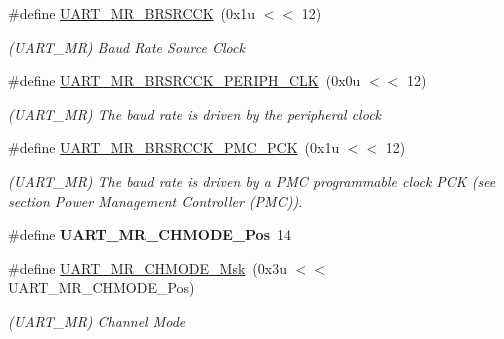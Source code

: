 \begin{DoxyCompactItemize}
\mbox{\label{group__SAME70__UART_gade244123e6a00af0a11e85f17bef8fe5}} 
\#define \mbox{\hyperlink{group__SAME70__UART_gade244123e6a00af0a11e85f17bef8fe5}{U\+A\+R\+T\+\_\+\+M\+R\+\_\+\+B\+R\+S\+R\+C\+CK}}~(0x1u $<$$<$ 12)
\begin{DoxyCompactList}\small\item\em (U\+A\+R\+T\+\_\+\+MR) Baud Rate Source Clock \end{DoxyCompactList}\item 
\mbox{\label{group__SAME70__UART_ga0025905c99e51c449ce67a4c670e9aad}} 
\#define \mbox{\hyperlink{group__SAME70__UART_ga0025905c99e51c449ce67a4c670e9aad}{U\+A\+R\+T\+\_\+\+M\+R\+\_\+\+B\+R\+S\+R\+C\+C\+K\+\_\+\+P\+E\+R\+I\+P\+H\+\_\+\+C\+LK}}~(0x0u $<$$<$ 12)
\begin{DoxyCompactList}\small\item\em (U\+A\+R\+T\+\_\+\+MR) The baud rate is driven by the peripheral clock \end{DoxyCompactList}\item 
\mbox{\label{group__SAME70__UART_gacb650203506640645a5b957f3bc92316}} 
\#define \mbox{\hyperlink{group__SAME70__UART_gacb650203506640645a5b957f3bc92316}{U\+A\+R\+T\+\_\+\+M\+R\+\_\+\+B\+R\+S\+R\+C\+C\+K\+\_\+\+P\+M\+C\+\_\+\+P\+CK}}~(0x1u $<$$<$ 12)
\begin{DoxyCompactList}\small\item\em (U\+A\+R\+T\+\_\+\+MR) The baud rate is driven by a P\+MC programmable clock P\+CK (see section Power Management Controller (P\+MC)). \end{DoxyCompactList}\item 
\mbox{\label{group__SAME70__UART_gadbe17e107662fa9f0d34d964911eb4bb}} 
\#define {\bfseries U\+A\+R\+T\+\_\+\+M\+R\+\_\+\+C\+H\+M\+O\+D\+E\+\_\+\+Pos}~14
\item 
\mbox{\label{group__SAME70__UART_gaae4c24ca9b88ad0fcc45c6525705d23c}} 
\#define \mbox{\hyperlink{group__SAME70__UART_gaae4c24ca9b88ad0fcc45c6525705d23c}{U\+A\+R\+T\+\_\+\+M\+R\+\_\+\+C\+H\+M\+O\+D\+E\+\_\+\+Msk}}~(0x3u $<$$<$ U\+A\+R\+T\+\_\+\+M\+R\+\_\+\+C\+H\+M\+O\+D\+E\+\_\+\+Pos)
\begin{DoxyCompactList}\small\item\em (U\+A\+R\+T\+\_\+\+MR) Channel Mode \end{DoxyCompactList}\item 

\end{DoxyCompactItemize}
